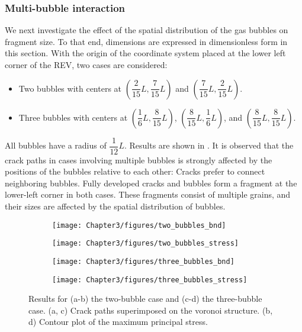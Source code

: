 \subsubsection{Multi-bubble interaction}

We next investigate the effect of the spatial distribution of the gas bubbles on fragment size. To that end, dimensions are expressed in dimensionless form in this section. With the origin of the coordinate system placed at the lower left corner of the REV, two cases are considered:
\begin{itemize}
  \item Two bubbles with centers at $\left( \dfrac{2}{15}L, \dfrac{7}{15}L \right)$ and $\left( \dfrac{7}{15}L, \dfrac{2}{15}L \right)$.
  \item Three bubbles with centers at $\left( \dfrac{1}{6}L, \dfrac{8}{15}L \right)$, $\left( \dfrac{8}{15}L, \dfrac{1}{6}L \right)$, and $\left( \dfrac{8}{15}L, \dfrac{8}{15}L \right)$.
\end{itemize}
All bubbles have a radius of $\dfrac{1}{12}L$. Results are shown in . It is observed that the crack paths in cases involving multiple bubbles is strongly affected by the positions of the bubbles relative to each other: Cracks prefer to connect neighboring bubbles. Fully developed cracks and bubbles form a fragment at the lower-left corner in both cases. These fragments consist of multiple grains, and their sizes are affected by the spatial distribution of bubbles.

\begin{figure}[htb!]
  \centering
  \begin{subfigure}[t]{0.35\linewidth}
    \centering
    \texttt{[image: Chapter3/figures/two\_bubbles\_bnd]}
    \caption{}
  \end{subfigure}
  \begin{subfigure}[t]{0.35\linewidth}
    \centering
    \texttt{[image: Chapter3/figures/two\_bubbles\_stress]}
    \caption{}
  \end{subfigure}
  
  \begin{subfigure}[t]{0.35\linewidth}
    \centering
    \texttt{[image: Chapter3/figures/three\_bubbles\_bnd]}
    \caption{}
  \end{subfigure}
  \begin{subfigure}[t]{0.35\linewidth}
    \centering
    \texttt{[image: Chapter3/figures/three\_bubbles\_stress]}
    \caption{}
  \end{subfigure}
  \caption[Crack propagation from multiple bubbles.]{Results for (a-b) the two-bubble case and (c-d) the three-bubble case. (a, c) Crack paths superimposed on the voronoi structure. (b, d) Contour plot of the maximum principal stress.}
  \label{fig:compare_bubble_distribution}
\end{figure}

